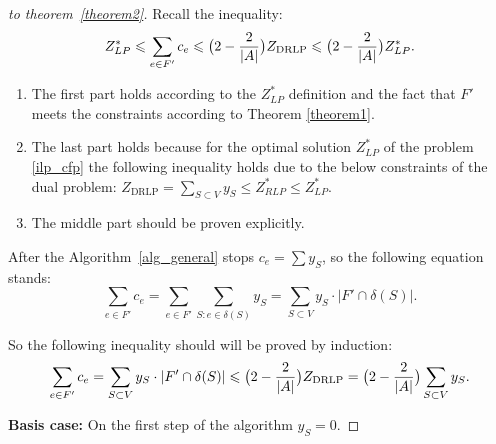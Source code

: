 \documentclass[12pt]{article}
\newtheorem{proof}{Proof}
\begin{document}
\begin{proof}[to theorem~\ref{theorem2}]
    Recall the  inequality:
     \[
    Z_{LP}^{\ast}\leqslant \sum\limits_{e\in F'}c_e \leqslant \bigl( 2 - \frac{2}{|A|}\bigr) Z_{\text{DRLP}}\leqslant
    \bigl( 2 - \frac{2}{|A|}\bigr) Z_{LP}^{\ast}.
     \]
    \begin{enumerate}
        \item The first part holds according to the $Z_{LP}^{\ast}$ definition and the fact that $F'$ meets the constraints according to Theorem \ref{theorem1}.
        \item The last part holds because for the optimal solution $Z_{LP}^{\ast}$ of the problem \ref{ilp_cfp} the following inequality holds due to the below constraints of the dual problem: $Z_{\text{DRLP}} =  \sum_{S\subset V}y_S \leqslant Z_{RLP}^{\ast}\leqslant Z_{LP}^{\ast}$.
        \item The middle part should be proven explicitly.
    \end{enumerate}

    After the Algorithm~\ref{alg_general} stops $c_e = \sum y_S$, so the following equation stands:
     \[\sum\limits_{e\in F'}c_e = \sum\limits_{e\in F'}\sum\limits_{S:e\in \delta(S)}y_S = \sum\limits_{S\subset V}y_S\cdot |F'\cap \delta(S)|. \]

    So the following inequality should will be proved by induction:
     \[\sum\limits_{e\in F'}c_e = \sum\limits_{S\subset V}y_S\cdot |F'\cap \delta(S)|\leqslant \bigl( 2 - \frac{2}{|A|}\bigr) Z_{\text{DRLP}}=\bigl( 2 - \frac{2}{|A|}\bigr) \sum\limits_{S\subset V}y_S. \]

    \textbf{Basis case:} On the first step of the algorithm $y_S = 0$.


\end{proof}
\end{document}
